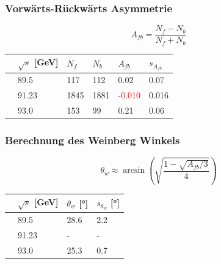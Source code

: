 \begin{frame}
	\frametitle{Vorwärts-Rückwärts Asymmetrie}
	\begin{equation*}
		A_{fb}=\frac{N_f-N_b}{N_f+N_b}
	\end{equation*}
	\begin{table}[h]\centering
		\begin{tabular}{@{}llllll@{}}
			\toprule
			&$\sqrt{s}$ [GeV]&$N_f$&$N_b$&$A_{fb}$&$s_{A_{fb}}$\\
			\midrule
			&89.5&117&112&0.02&0.07\\
			&91.23&1845&1881&\textcolor{red}{-0.010}&0.016\\
			&93.0&153&99&0.21&0.06\\
			\bottomrule
		\end{tabular}
	\end{table}
\end{frame}
\begin{frame}
	\frametitle{Berechnung des Weinberg Winkels}
	\begin{equation*}
		\theta_w\approx\arcsin(\sqrt{\frac{1-\sqrt{A_{fb}/3}}{4}})
	\end{equation*}
	\begin{table}[h]\centering
		\begin{tabular}{@{}llll@{}}
			\toprule
			&$\sqrt{s}$ [GeV]&$\theta_w$ 	[°]&$s_{\theta_w}$ [°]\\
			\midrule
			&89.5&28.6&2.2\\
			&91.23&-&-\\
			&93.0&25.3&0.7\\
			\bottomrule
		\end{tabular}
	\end{table}
\end{frame}





